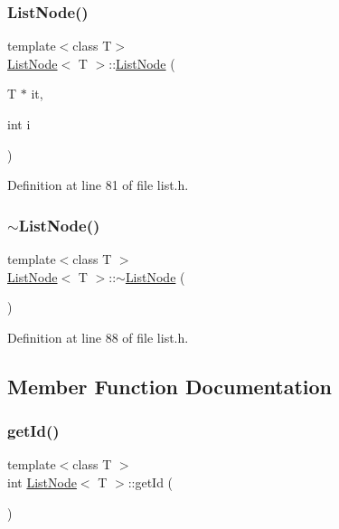 \subsubsection{\texorpdfstring{List\+Node()}{ListNode()}}
{\footnotesize\ttfamily template$<$class T$>$ \\
\hyperlink{classListNode}{List\+Node}$<$ T $>$\+::\hyperlink{classListNode}{List\+Node} (\begin{DoxyParamCaption}\item[{T $\ast$}]{it,  }\item[{int}]{i }\end{DoxyParamCaption})}



Definition at line 81 of file list.\+h.

\mbox{\label{classListNode_abe41245574baa42781b71f70e49fd06b}} 
\subsubsection{\texorpdfstring{$\sim$\+List\+Node()}{~ListNode()}}
{\footnotesize\ttfamily template$<$class T $>$ \\
\hyperlink{classListNode}{List\+Node}$<$ T $>$\+::$\sim$\hyperlink{classListNode}{List\+Node} (\begin{DoxyParamCaption}{ }\end{DoxyParamCaption})}



Definition at line 88 of file list.\+h.



\subsection{Member Function Documentation}
\mbox{\label{classListNode_a38a21e03d0174e0f9ab38495e25bafbf}} 
\subsubsection{\texorpdfstring{get\+Id()}{getId()}}
{\footnotesize\ttfamily template$<$class T $>$ \\
int \hyperlink{classListNode}{List\+Node}$<$ T $>$\+::get\+Id (\begin{DoxyParamCaption}{ }\end{DoxyParamCaption})}



